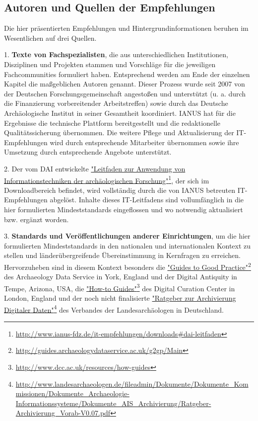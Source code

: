 \subsection*{Autoren und Quellen der Empfehlungen}
Die hier präsentierten Empfehlungen und Hintergrundinformationen beruhen im Wesentlichen auf drei Quellen.

1. \textbf{Texte von Fachspezialisten}, die aus unterschiedlichen Institutionen, Disziplinen und Projekten stammen und Vorschläge für die jeweiligen Fachcommunities formuliert haben. Entsprechend werden am Ende der einzelnen Kapitel die maßgeblichen Autoren genannt. Dieser Prozess wurde seit 2007 von der Deutschen Forschungsgemeinschaft angestoßen und unterstützt (u. a. durch die Finanzierung vorbereitender Arbeitstreffen) sowie durch das Deutsche Archäologische Institut in seiner Gesamtheit koordiniert. IANUS hat für die Ergebnisse die technische Plattform bereitgestellt und die redaktionelle Qualitätssicherung übernommen. Die weitere Pflege und Aktualisierung der IT-Empfehlungen wird durch entsprechende Mitarbeiter übernommen sowie ihre Umsetzung durch entsprechende Angebote unterstützt.

2. Der vom DAI entwickelte \href{http://www.ianus-fdz.de/it-empfehlungen/downloads\#dai-leitfaden}{"Leitfaden zur Anwendung von Informationstechniken der archäologischen Forschung"}\footnote{\url{http://www.ianus-fdz.de/it-empfehlungen/downloads\#dai-leitfaden}}, der sich im Downloadbereich befindet, wird vollständig durch die von IANUS betreuten IT-Empfehlungen abgelöst. Inhalte dieses IT-Leitfadens sind vollumfänglich in die hier formulierten Mindeststandards eingeflossen und wo notwendig aktualisiert bzw. ergänzt worden.

3. \textbf{Standards und Veröffentlichungen anderer Einrichtungen}, um die hier formulierten Mindeststandards in den nationalen und internationalen Kontext zu stellen und länderübergreifende Übereinstimmung in Kernfragen zu erreichen. Hervorzuheben sind in diesem Kontext besonders die \href{http://guides.archaeologydataservice.ac.uk/g2gp/Main}{"Guides to Good Practice"}\footnote{\url{http://guides.archaeologydataservice.ac.uk/g2gp/Main}} des Archaeology Data Service in York, England und der Digital Antiquity in Tempe, Arizona, USA, die \href{http://www.dcc.ac.uk/resources/how-guides}{"How-to Guides"}\footnote{\url{http://www.dcc.ac.uk/resources/how-guides}} des Digital Curation Center in London, England und der noch nicht finalisierte \href{http://www.landesarchaeologen.de/fileadmin/Dokumente/Dokumente_Kommissionen/Dokumente_Archaeologie-Informationssysteme/Dokumente_AIS_Archivierung/Ratgeber-Archivierung_Vorab-V0.07.pdf}{"Ratgeber zur Archivierung Digitaler Daten"}\footnote{\url{http://www.landesarchaeologen.de/fileadmin/Dokumente/Dokumente_Kommissionen/Dokumente_Archaeologie-Informationssysteme/Dokumente_AIS_Archivierung/Ratgeber-Archivierung_Vorab-V0.07.pdf}} des Verbandes der Landesarchäologen in Deutschland.

